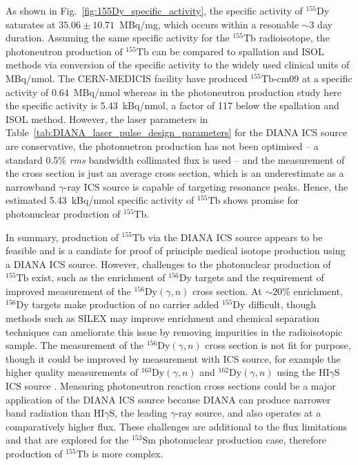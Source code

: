 As shown in Fig.~\ref{fig:155Dy_specific_activity}, the specific activity of $^{155}\mathrm{Dy}$ saturates at $35.06\pm 10.71$~\si{\mega\becquerel}/\si{\milli\gram}, which occurs within a resonable $\sim$3 day duration. Assuming the same specific activity for the $^{155}\mathrm{Tb}$ radioisotope, the photoneutron production of $^{155}\mathrm{Tb}$ can be compared to spallation and ISOL methods via conversion of the specific activity to the widely used clinical units of
\si{\mega\becquerel}/\si{\nano\mole}. The CERN-MEDICIS facility have produced $^{155}\mathrm{Tb}$-cm09 at a specific activity of 0.64~\si{\mega\becquerel}/\si{\nano\mole} \cite{muller2012unique} whereas in the photoneutron production study here the specific activity is 5.43~\si{\kilo\becquerel}/\si{\nano\mole}, a factor of 117 below the spallation and ISOL method. However, the laser parameters in Table~\ref{tab:DIANA_laser_pulse_design_parameters} for the DIANA ICS source are conservative, the photonuetron production has not been optimised -- a standard 0.5\% \textit{rms} bandwidth collimated flux is used -- and the measurement of the cross section is just an average cross section, which is an underestimate as a narrowband $\gamma$-ray ICS source is capable of targeting resonance peaks. Hence, the estimated 5.43~\si{\kilo\becquerel}/\si{\nano\mole} specific activity of $^{155}\mathrm{Tb}$ shows promise for photonuclear production of $^{155}\mathrm{Tb}$.

In summary, production of $^{155}\mathrm{Tb}$ via the DIANA ICS source appears to be feasible and is a candiate for proof of principle medical isotope production using a DIANA ICS source. However, challenges to the photonuclear production of $^{155}\mathrm{Tb}$ exist, such as the enrichment of $^{156}\mathrm{Dy}$ targets and the requirement of improved measurement of the $^{156}\mathrm{Dy}\left(\gamma,n\right)$ cross section. At $\sim20$\% enrichment, $^{156}\mathrm{Dy}$ targets make production of no carrier added $^{155}\mathrm{Dy}$ difficult, though methods such as SILEX \cite{} may improve enrichment and chemical separation techniques \cite{webster2019chemical} can ameliorate this issue by removing impurities in the radioisotopic sample. The measurement of the $^{156}\mathrm{Dy}\left(\gamma,n\right)$ cross section is not fit for purpose, though it could be improved by measurement with ICS source, for example the higher quality measurements of $^{163}\mathrm{Dy}\left(\gamma,n\right)$ and $^{162}\mathrm{Dy}\left(\gamma,n\right)$ using the HI$\gamma$S ICS source \cite{renstrom2018verification}. Measuring photoneutron reaction cross sections could be a major application of the DIANA ICS source because DIANA can produce narrower band radiation than HI$\gamma$S, the leading $\gamma$-ray source, and also operates at a comparatively higher flux. These challenges are additional to the flux limitations and that are explored for the $^{153}\mathrm{Sm}$ photonuclear production case, therefore production of $^{155}\mathrm{Tb}$ is more complex.  
